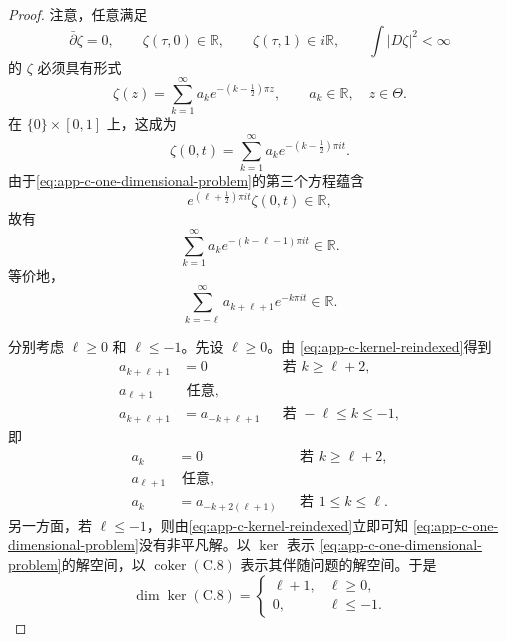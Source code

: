 \begin{proof}
注意，任意满足
\[
 \bar\partial\zeta=0,
 \qquad\zeta(\tau,0)\in\mathbb R,
 \qquad\zeta(\tau,1)\in i\mathbb R,
 \qquad\int|D\zeta|^2<\infty
\]
的 $\zeta$ 必须具有形式
\[
 \zeta(z)=\sum_{k=1}^{\infty}a_ke^{-(k-\frac12)\pi z},
 \qquad a_k\in\mathbb R,\quad z\in\Theta.
\]
在 $\{0\}\times[0,1]$ 上，这成为
\[
 \zeta(0,t)=\sum_{k=1}^{\infty}a_ke^{-(k-\frac12)\pi it}.
\]
由于\eqref{eq:app-c-one-dimensional-problem}的第三个方程蕴含
\[
 e^{(\ell+\frac12)\pi it}\zeta(0,t)\in\mathbb R,
\]
故有
\[
 \sum_{k=1}^{\infty}a_ke^{-(k-\ell-1)\pi it}\in\mathbb R.
\]
等价地，
\begin{equation}
\label{eq:app-c-kernel-reindexed}
 \sum_{k=-\ell}^{\infty}a_{k+\ell+1}e^{-k\pi it}\in\mathbb R.
\end{equation}

分别考虑 $\ell\geq0$ 和 $\ell\leq-1$。先设 $\ell\geq0$。由
\eqref{eq:app-c-kernel-reindexed}得到
\[
 \begin{aligned}
 a_{k+\ell+1}&=0&&\text{若 }k\geq\ell+2,\\
 a_{\ell+1}&\text{ 任意},\\
 a_{k+\ell+1}&=a_{-k+\ell+1}&&\text{若 }-\ell\leq k\leq-1,
 \end{aligned}
\]
即
\[
 \begin{aligned}
 a_k&=0&&\text{若 }k\geq\ell+2,\\
 a_{\ell+1}&\text{ 任意},\\
 a_k&=a_{-k+2(\ell+1)}&&\text{若 }1\leq k\leq\ell.
 \end{aligned}
\]
另一方面，若 $\ell\leq-1$，则由\eqref{eq:app-c-kernel-reindexed}立即可知
\eqref{eq:app-c-one-dimensional-problem}没有非平凡解。以 $\ker$ 表示
\eqref{eq:app-c-one-dimensional-problem}的解空间，以
$\operatorname{coker}(\mathrm{C.8})$ 表示其伴随问题的解空间。于是
\begin{equation}
\label{eq:app-c-kernel-dimension}
 \dim\ker(\mathrm{C.8})=
 \begin{cases}
 \ell+1,&\ell\geq0,\\
 0,&\ell\leq-1.
 \end{cases}
\end{equation}


\end{proof}
